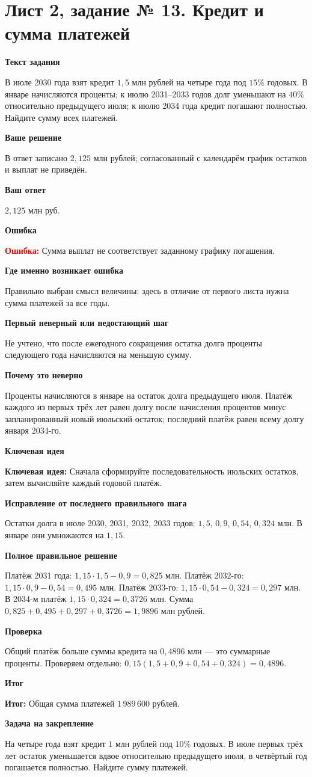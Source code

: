 \documentclass[11pt,a4paper]{article}
\newcommand{\Idea}{\textcolor{blue!60!black}{\textbf{Ключевая идея:}}}
\newcommand{\Res}{\textcolor{teal!60!black}{\textbf{Итог:}}}
\newcommand{\Heading}[2]{\par\medskip\textbf{#1}\par#2\par}
\begin{document}
\section*{Лист 2, задание № 13. Кредит и сумма платежей}
\Heading{Текст задания}{В июле 2030 года взят кредит $1{,}5$ млн рублей на четыре года под $15\%$ годовых. В январе начисляются проценты; к июлю 2031--2033 годов долг уменьшают на $40\%$ относительно предыдущего июля; к июлю 2034 года кредит погашают полностью. Найдите сумму всех платежей.}
\Heading{Ваше решение}{В ответ записано $2{,}125$ млн рублей; согласованный с календарём график остатков и выплат не приведён.}
\Heading{Ваш ответ}{$2{,}125$ млн руб.}
\Heading{Ошибка}{\textcolor{red}{\textbf{Ошибка:}} Сумма выплат не соответствует заданному графику погашения.}
\Heading{Где именно возникает ошибка}{Правильно выбран смысл величины: здесь в отличие от первого листа нужна сумма платежей за все годы.}
\Heading{Первый неверный или недостающий шаг}{Не учтено, что после ежегодного сокращения остатка долга проценты следующего года начисляются на меньшую сумму.}
\Heading{Почему это неверно}{Проценты начисляются в январе на остаток долга предыдущего июля. Платёж каждого из первых трёх лет равен долгу после начисления процентов минус запланированный новый июльский остаток; последний платёж равен всему долгу января 2034-го.}
\Heading{Ключевая идея}{\Idea{} Сначала сформируйте последовательность июльских остатков, затем вычисляйте каждый годовой платёж.}
\Heading{Исправление от последнего правильного шага}{Остатки долга в июле 2030, 2031, 2032, 2033 годов: $1{,}5$, $0{,}9$, $0{,}54$, $0{,}324$ млн. В январе они умножаются на $1{,}15$.}
\Heading{Полное правильное решение}{Платёж 2031 года: $1{,}15\cdot1{,}5-0{,}9=0{,}825$ млн. Платёж 2032-го: $1{,}15\cdot0{,}9-0{,}54=0{,}495$ млн. Платёж 2033-го: $1{,}15\cdot0{,}54-0{,}324=0{,}297$ млн. В 2034-м платёж $1{,}15\cdot0{,}324=0{,}3726$ млн. Сумма $0{,}825+0{,}495+0{,}297+0{,}3726=1{,}9896$ млн рублей.}
\Heading{Проверка}{Общий платёж больше суммы кредита на $0{,}4896$ млн --- это суммарные проценты. Проверяем отдельно: $0{,}15(1{,}5+0{,}9+0{,}54+0{,}324)=0{,}4896$.}
\Heading{Итог}{\Res{} Общая сумма платежей $1\,989\,600$ рублей.}
\Heading{Задача на закрепление}{На четыре года взят кредит $1$ млн рублей под $10\%$ годовых. В июле первых трёх лет остаток уменьшается вдвое относительно предыдущего июля, в четвёртый год погашается полностью. Найдите сумму платежей.}
\newpage
{}\label{task:2_17}
\end{document}
